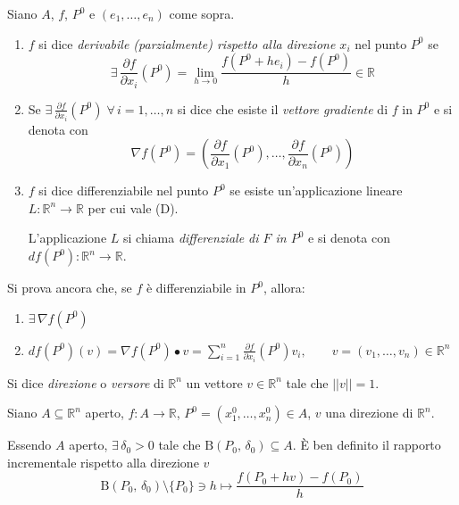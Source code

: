 \begin{definition}
Siano $A$, $f$, $P^0$ e $(e_1,\ldots,e_n)$ come sopra.
\begin{enumerate}[labelindent=\parindent,leftmargin=*,label=\textnormal{(\roman*)},start=1]
\item $f$ si dice \emph{derivabile (parzialmente) rispetto alla direzione $x_i$} nel punto $P^0$ se
$$
\exists \, \frac{\partial f}{\partial x_i} (P^0) = \lim_{h \rightarrow 0} \frac{f(P^0+he_i)-f(P^0)}{h} \in \mathbb{R}
$$

\item Se $\displaystyle \exists \, \frac{\partial f}{\partial x_i} (P^0) \; \forall \, i=1,\ldots,n$ si dice che esiste il \emph{vettore gradiente} di $f$ in $P^0$ e si denota con
$$
\nabla f(P^0) = \left( \frac{\partial f}{\partial x_1}(P^0),\ldots,\frac{\partial f}{\partial x_n}(P^0) \right)
$$

\item $f$ si dice differenziabile nel punto $P^0$ se esiste un'applicazione lineare $L:\mathbb{R}^n \rightarrow \mathbb{R}$ per cui vale (D).

L'applicazione $L$ si chiama \emph{differenziale di $F$ in $P^0$} e si denota con $df(P^0):\mathbb{R}^n \rightarrow \mathbb{R}$.
\end{enumerate}
\end{definition}

Si prova ancora che, se $f$ è differenziabile in $P^0$, allora:
\begin{enumerate}[labelindent=\parindent,leftmargin=*,label=\textnormal{(\roman*)},start=1]
\item $\exists \, \nabla f(P^0)$
\item $\displaystyle df(P^0)(v) = \nabla f(P^0) \bullet v = \sum_{i=1}^n \frac{\partial f}{\partial x_i} (P^0)v_i, \qquad v=(v_1,\ldots,v_n) \in \mathbb{R}^n$
\end{enumerate}

\begin{definition}
Si dice \emph{direzione} o \emph{versore} di $\mathbb{R}^n$ un vettore $v \in \mathbb{R}^n$ tale che $||v|| = 1$.
\end{definition}

Siano $A \subseteq \mathbb{R}^n$ aperto, $f: A \longrightarrow \mathbb{R}$, $P^0 = (x_1^0,\ldots,x_n^0) \in A$, $v$ una direzione di $\mathbb{R}^n$.

Essendo $A$ aperto, $\exists \, \delta_0 > 0$ tale che $\mathrm{B}(P_0,\,\delta_0) \subseteq A$. \`E ben definito il rapporto incrementale rispetto alla direzione $v$
$$
\mathrm{B}(P_0,\,\delta_0) \setminus \lbrace P_0 \rbrace \ni h \longmapsto
\frac{f(P_0+hv)-f(P_0)}{h}
$$

